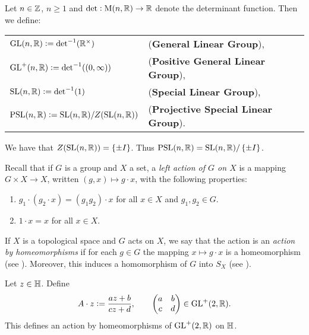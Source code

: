 \begin{definition}
	Let $n \in \mathbb{Z}$, $n \geq 1$ and $\mathrm{det} : \mathrm{M}(n,\mathbb{R}) \to \mathbb{R}$ denote the determinant function. Then we define:
	\begin{center}
		\begin{tabular}{ll}
			$\mathrm{GL}(n,\mathbb{R}) := \mathrm{det}^{-1}(\mathbb{R}^\times)$ & (\textbf{General Linear Group}),\\
			$\GLrm^+(n,\Rbb) := \det^{-1}(\intoo{0,\infty})$ & (\textbf{Positive General Linear Group}),\\
			$\mathrm{SL}(n,\mathbb{R}) := \mathrm{det}^{-1}(1)$ & (\textbf{Special Linear Group}),\\
			$\mathrm{PSL}(n,\mathbb{R}) := \mathrm{SL}(n,\mathbb{R})/ Z(\mathrm{SL}(n,\mathbb{R}))$ & (\textbf{Projective Special Linear Group}).\\
		\end{tabular}
	\end{center}
\end{definition}

\begin{remark}
	We have that $Z(\SLrm(n,\Rbb)) = \cbr[0]{\pm I}$. Thus $\PSLrm(n,\Rbb) = \SLrm(n,\Rbb)/\cbr[0]{\pm I}$.
\end{remark}

Recall that if $G$ is a group and $X$ a set, a \emph{left action of $G$ on $X$} is a mapping $G \times X \to X$, written $(g,x) \mapsto g \cdot x$, with the following properties:
\begin{enumerate}[label = \textup{(}\roman*\textup{)}]
	\item $g_1 \cdot (g_2 \cdot x) = (g_1g_2) \cdot x$ for all $x \in X$ and $g_1,g_2 \in G$.
	\item $1 \cdot x = x$ for all $x \in X$.
\end{enumerate}
If $X$ is a topological space and $G$ acts on $X$, we say that the action is an \emph{action by homeomorphisms} if for each $g \in G$ the mapping $x \mapsto g \cdot x$ is a homeomorphism (see \cite[78--79]{lee:topological_manifolds:2011}). Moreover, this induces a homomorphism of $G$ into $S_X$ (see \cite[54]{grillet:abstract_algebra:2007}).

\begin{proposition}
	Let $z \in \mathbb{H}$. Define 
	\begin{equation}
		A \cdot z := \frac{az + b}{cz + d}, \qquad \begin{pmatrix}
			a & b\\
			c & d
		\end{pmatrix} \in \mathrm{GL}^+(2,\mathbb{R}).
	\end{equation}
	This defines an action by homeomorphisms of $\mathrm{GL}^+(2,\mathbb{R})$ on $\mathbb{H}$.
	\label{prop:action}
\end{proposition}

